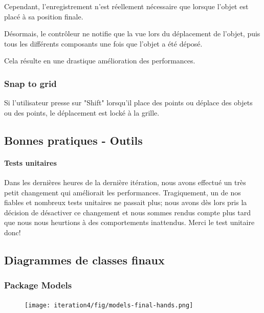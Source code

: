 	Cependant, l'enregistrement n'est réellement nécessaire que lorsque l'objet
	est placé à sa position finale.

	Désormais, le contrôleur ne notifie que la vue lors du déplacement de l'objet,
	puis tous les différents composants une fois que l'objet a été déposé.

	Cela résulte en une drastique amélioration des performances.

	\subsubsection{Snap to grid}
	Si l'utilisateur presse sur "Shift" lorsqu'il place des points ou déplace
	des objets ou des points, le déplacement est locké à la grille.

\subsection{Bonnes pratiques - Outils}

	\paragraph{Tests unitaires}
	Dans les dernières heures de la dernière itération, nous avons effectué un 
	très petit changement qui améliorait les performances. Tragiquement, un de nos
	fiables et nombreux tests unitaires ne passait plus; nous avons dès lors 
	pris la décision de désactiver ce changement et nous sommes rendus compte plus
	tard que nous nous heurtions à des comportements inattendus. Merci le test 
	unitaire donc!

\subsection{Diagrammes de classes finaux}

	\subsubsection{Package Models}
	\begin{figure}
		\center
		\texttt{[image: iteration4/fig/models-final-hands.png]}
	\end{figure}


